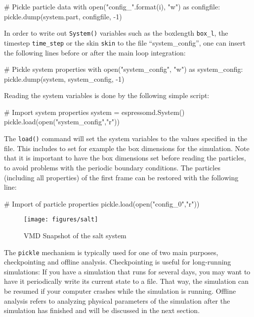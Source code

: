 \documentclass[
a4paper,                        %
11pt,                           %
twoside,                        %
footsepline,                    %
headsepline,                    %
headexclude,                    %
footexclude,                    %
pagesize,                       %
]{scrartcl}
\begin{document}
\begin{tclcode}
    # Pickle particle data
    with open("config_{}".format(i), "w") as configfile:
        pickle.dump(system.part, configfile, -1)
\end{tclcode}

In order to write out \verb|System()| variables such as the boxlength 
\verb|box_l|, the timestep \verb|time_step| or the skin \verb|skin| to the 
file ``system\_config'', one can insert the following lines before or after the 
main loop integration:

\begin{tclcode}
# Pickle system properties
with open("system_config", "w") as system_config:
    pickle.dump(system, system_config, -1)
\end{tclcode}


Reading the system variables is done by the following simple script:

\begin{tclcode}
# Import system properties
system = espressomd.System()
pickle.load(open("system_config","r"))
\end{tclcode}

The \verb|load()| command will set the system variables
to the values specified in the file. This includes to set for example 
the box dimensions for the simulation. Note that it is important to have the box 
dimensions set before reading the particles, to avoid problems with the periodic 
boundary conditions. The particles (including all properties) of the first 
frame can be restored with the following line:

\begin{tclcode}
# Import of particle properties
pickle.load(open("config_0","r"))
\end{tclcode}


\begin{figure}[tb]
  \centering
  \texttt{[image: figures/salt]}
  \caption{VMD Snapshot of the salt system}
  \label{fig:snapshot}
\end{figure}

The \verb|pickle| mechanism is typically used for one of two main
purposes, checkpointing and offline analysis.
Checkpointing is useful for long-running simulations: If you have
a simulation that runs for several days, you may want to have it
periodically write its current state to a file. That way, the
simulation can be resumed if your computer crashes while the
simulation is running.
Offline analysis refers to analyzing physical parameters of the
simulation after the simulation has finished and will be discussed in
the next section.
\end{document}
